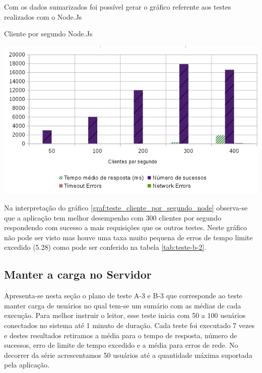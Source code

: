   Com os dados sumarizados foi possível gerar o gráfico referente aos testes realizados com o Node.Js

  \begin{grafico}[H]
    \setlength{\abovecaptionskip}{5pt}
    \setlength{\belowcaptionskip}{0pt}

    \caption[Cliente por segundo Node.Js]
	    {Cliente por segundo Node.Js}
    \centering
    \includegraphics[width=.80\textwidth]{imagem/graficos/grafico_node_plano_de_teste_2.png}
    \captionsetup[grafico]{justification=centering}
    \label{graf:teste_cliente_por_segundo_node}
  \end{grafico}

  Na interpretação do gráfico \ref{graf:teste_cliente_por_segundo_node} observa-se que a aplicação tem melhor desempenho
  com 300 clientes por segundo respondendo com sucesso a mais requisições que os outros testes. Neste gráfico não pode
  ser visto mas houve uma taxa muito pequena de erros de tempo limite excedido (5.28) como pode ser conferido na tabela
  \ref{tab:teste-b-2}.



\subsection{Manter a carga no Servidor}


  Apresenta-se nesta seção o plano de teste A-3 e B-3 que corresponde ao teste manter carga de usuários no qual tem-se um sumário
  com as médias de cada execução.
  Para melhor instruir o leitor, esse teste inicia com 50 a 100 usuários conectados no sistema até 1 minuto de duração. Cada teste
  foi executado 7 vezes e destes resultados retiramos a média para o tempo de resposta, número de sucessos, erro de limite de tempo excedido
  e a média para erros de rede. No decorrer da série acrescentamos 50 usuários até a quantidade máxima suportada pela aplicação.

